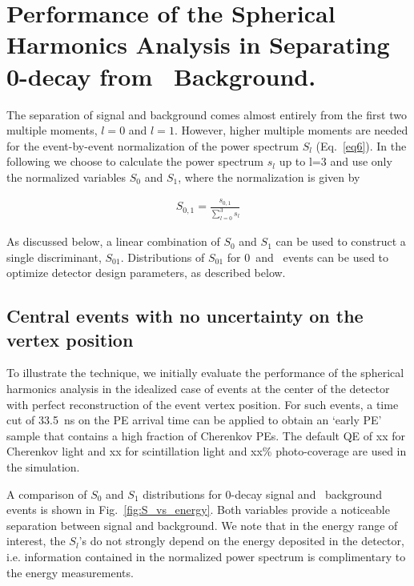 \section{Performance of the Spherical Harmonics Analysis in Separating 0\nbb-decay from \B~Background.}
\label{sec:performance}

The separation of signal and background comes almost entirely from the
first two multiple moments, $l=0$ and $l=1$. However, higher multiple
moments are needed for the event-by-event normalization of the power spectrum
$S_l$ (Eq.~\ref{eq6}). In the following we choose to calculate the
power spectrum $s_l$ up to l=3 and use only the normalized variables $S_0$
and $S_1$, where the normalization is given by

\begin{eqnarray}
\label{eq7}
S_{0,1} = \frac{s_{0,1}}{\sum_{l=0}^{3} s_l}
\end{eqnarray}

As discussed below, a linear combination of $S_0$ and $S_1$ can be
used to construct a single discriminant, $S_{01}$. 
Distributions of $S_{01}$ for 0\nbb~and \B~events can be used to optimize
detector design parameters, as described below.

\subsection{Central events with no uncertainty on the vertex position}

To illustrate the technique, we initially evaluate 
the performance of the spherical harmonics
analysis in the idealized case of events at the center of the
detector with perfect reconstruction of the event vertex
position. For such events, a time cut of 33.5~ns on the PE arrival
time can be applied to obtain an `early PE' sample that contains a
high fraction of Cherenkov PEs. The default QE of xx for Cherenkov
light and xx for scintillation light and xx\% photo-coverage are used
in the simulation.

A comparison of $S_0$ and $S_1$ distributions for 0\nbb-decay signal
and \B~background events is shown in Fig.~\ref{fig:S_vs_energy}.  Both
variables provide a noticeable separation between signal and
background. We note that in the energy range of interest, the
$S_l$'s do not strongly depend on the energy deposited in the
detector, i.e. information contained in the normalized power
spectrum is complimentary to the energy measurements. 

